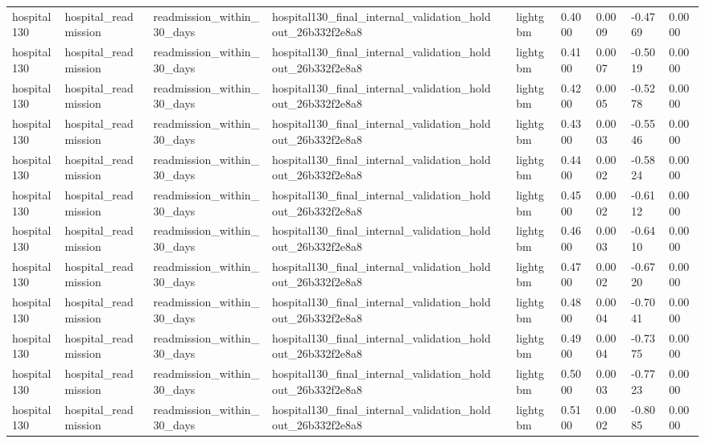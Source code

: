 \begin{tabular}{llllllllll}
hospital130 & hospital\_readmission & readmission\_within\_30\_days & hospital130\_final\_internal\_validation\_holdout\_26b332f2e8a8 &  & lightgbm & 0.4000 & 0.0009 & -0.4769 & 0.0000 \\
hospital130 & hospital\_readmission & readmission\_within\_30\_days & hospital130\_final\_internal\_validation\_holdout\_26b332f2e8a8 &  & lightgbm & 0.4100 & 0.0007 & -0.5019 & 0.0000 \\
hospital130 & hospital\_readmission & readmission\_within\_30\_days & hospital130\_final\_internal\_validation\_holdout\_26b332f2e8a8 &  & lightgbm & 0.4200 & 0.0005 & -0.5278 & 0.0000 \\
hospital130 & hospital\_readmission & readmission\_within\_30\_days & hospital130\_final\_internal\_validation\_holdout\_26b332f2e8a8 &  & lightgbm & 0.4300 & 0.0003 & -0.5546 & 0.0000 \\
hospital130 & hospital\_readmission & readmission\_within\_30\_days & hospital130\_final\_internal\_validation\_holdout\_26b332f2e8a8 &  & lightgbm & 0.4400 & 0.0002 & -0.5824 & 0.0000 \\
hospital130 & hospital\_readmission & readmission\_within\_30\_days & hospital130\_final\_internal\_validation\_holdout\_26b332f2e8a8 &  & lightgbm & 0.4500 & 0.0002 & -0.6112 & 0.0000 \\
hospital130 & hospital\_readmission & readmission\_within\_30\_days & hospital130\_final\_internal\_validation\_holdout\_26b332f2e8a8 &  & lightgbm & 0.4600 & 0.0003 & -0.6410 & 0.0000 \\
hospital130 & hospital\_readmission & readmission\_within\_30\_days & hospital130\_final\_internal\_validation\_holdout\_26b332f2e8a8 &  & lightgbm & 0.4700 & 0.0002 & -0.6720 & 0.0000 \\
hospital130 & hospital\_readmission & readmission\_within\_30\_days & hospital130\_final\_internal\_validation\_holdout\_26b332f2e8a8 &  & lightgbm & 0.4800 & 0.0004 & -0.7041 & 0.0000 \\
hospital130 & hospital\_readmission & readmission\_within\_30\_days & hospital130\_final\_internal\_validation\_holdout\_26b332f2e8a8 &  & lightgbm & 0.4900 & 0.0004 & -0.7375 & 0.0000 \\
hospital130 & hospital\_readmission & readmission\_within\_30\_days & hospital130\_final\_internal\_validation\_holdout\_26b332f2e8a8 &  & lightgbm & 0.5000 & 0.0003 & -0.7723 & 0.0000 \\
hospital130 & hospital\_readmission & readmission\_within\_30\_days & hospital130\_final\_internal\_validation\_holdout\_26b332f2e8a8 &  & lightgbm & 0.5100 & 0.0002 & -0.8085 & 0.0000 \\

\end{tabular}
